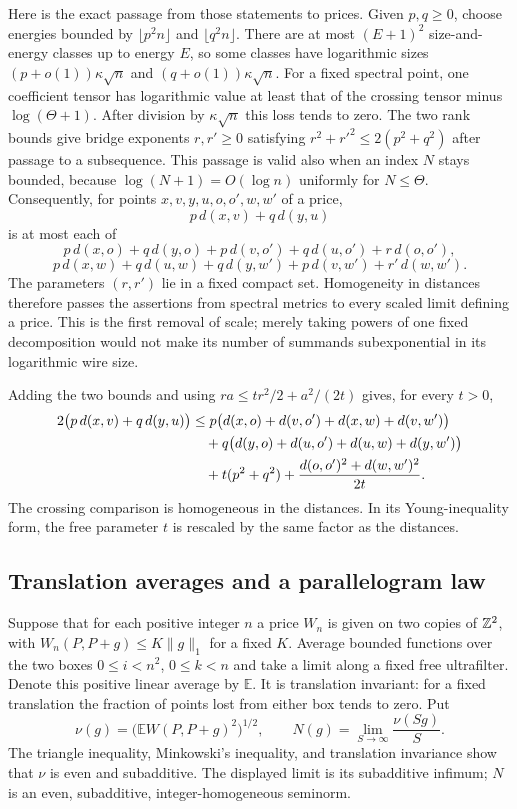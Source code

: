 Here is the exact passage from those statements to prices.
Given $p,q\geq0$, choose energies bounded by
$\lfloor p^2 n\rfloor$ and $\lfloor q^2 n\rfloor$.
There are at most $(E+1)^2$ size-and-energy classes up to energy
$E$, so some classes have logarithmic sizes
$(p+o(1))\kappa\sqrt n$ and $(q+o(1))\kappa\sqrt n$.
For a fixed spectral point, one coefficient tensor has logarithmic
value at least that of the crossing tensor minus
$\log(\Theta+1)$.
After division by $\kappa\sqrt n$ this loss tends to zero.
The two rank bounds give bridge exponents $r,r'\geq0$ satisfying
$r^2+r'^2\leq2(p^2+q^2)$ after passage to a subsequence.
This passage is valid also when an index $N$ stays bounded,
because $\log(N+1)=O(\log n)$ uniformly for $N\leq\Theta$.
Consequently, for points $x,v,y,u,o,o',w,w'$ of a price,
\[
 p\,d(x,v)+q\,d(y,u)
\]
is at most each of
\[
 p\,d(x,o)+q\,d(y,o)+p\,d(v,o')+q\,d(u,o')+r\,d(o,o'),
\]
\[
 p\,d(x,w)+q\,d(u,w)+q\,d(y,w')+p\,d(v,w')+r'\,d(w,w').
\]
The parameters $(r,r')$ lie in a fixed compact set.
Homogeneity in distances therefore passes the assertions from
spectral metrics to every scaled limit defining a price.
This is the first removal of scale; merely taking powers of one
fixed decomposition would not make its number of summands
subexponential in its logarithmic wire size.

Adding the two bounds and using
$r a\leq t r^2/2+a^2/(2t)$ gives, for every $t>0$,
\begin{align}
 2\bigl(p\,d(x,v)+q\,d(y,u)\bigr)
 &\leq p\bigl(d(x,o)+d(v,o')+d(x,w)+d(v,w')\bigr)\notag\\
 &\quad+q\bigl(d(y,o)+d(u,o')+d(u,w)+d(y,w')\bigr)\notag\\
 &\quad+t(p^2+q^2)
       +\frac{d(o,o')^2+d(w,w')^2}{2t}.
 \label{eq:crossing-young}
\end{align}
The crossing comparison is homogeneous in the distances.
In its Young-inequality form, the free parameter $t$ is rescaled
by the same factor as the distances.

\subsection{Translation averages and a parallelogram law}

Suppose that for each positive integer $n$ a price $W_n$ is given
on two copies of $\mathbb Z^2$, with
$W_n(P,P+g)\leq K\|g\|_1$ for a fixed $K$.
Average bounded functions over the two boxes
$0\leq i<n^2$, $0\leq k<n$ and take a limit along a fixed free
ultrafilter. Denote this positive linear average by $\mathbb E$.
It is translation invariant: for a fixed translation the fraction
of points lost from either box tends to zero.
Put
\[
 \nu(g)=\bigl(\mathbb E W(P,P+g)^2\bigr)^{1/2},
 \qquad N(g)=\lim_{S\to\infty}\frac{\nu(Sg)}S.
\]
The triangle inequality, Minkowski's inequality, and translation
invariance show that $\nu$ is even and subadditive.
The displayed limit is its subadditive infimum; $N$ is an even,
subadditive, integer-homogeneous seminorm.

